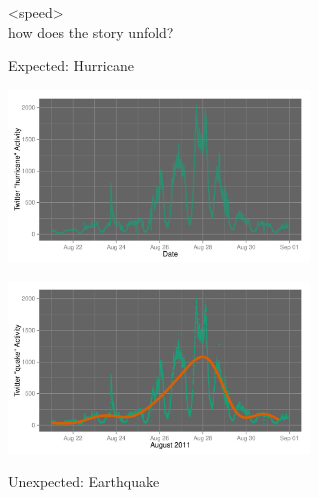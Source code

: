 \documentclass{beamer}
\begin{document}

\begin{frame}
\begin{center}
{\Huge <speed> \\ [10pt]  how does the story unfold?}
\end{center}
\end{frame}


\begin{frame}
\begin{center}
{\Huge Expected: Hurricane}
\end{center}
\end{frame}

\begin{frame}
  \begin{center}
    \includegraphics[width=8cm]{./imgs/hurricane.pdf}
  \end{center}
\end{frame}

\begin{frame}
  \begin{center}
    \includegraphics[width=8cm]{./imgs/hurricane_trend.pdf}
  \end{center}
\end{frame}

\begin{frame}
\begin{center}
{\Huge Unexpected: Earthquake}
\end{center}
\end{frame}
\end{document}
